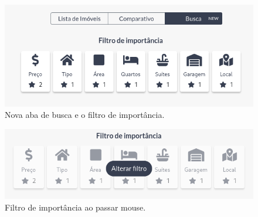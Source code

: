 \begin{figure}[H]
    \centering
    \includegraphics[scale=0.6]{figuras/desenvolvimento/componente_filtro.png}
    \caption[Nova aba de busca e o filtro de importância]{Nova aba de busca e o filtro de importância.}
    \label{fig:componente_filtro}
\end{figure}

\begin{figure}[H]
    \centering
    \includegraphics[scale=0.6]{figuras/desenvolvimento/componente_filtro2.png}
    \caption[Filtro de importância ao passar mouse]{Filtro de importância ao passar mouse.}
    \label{fig:componente_filtro2}
\end{figure}

